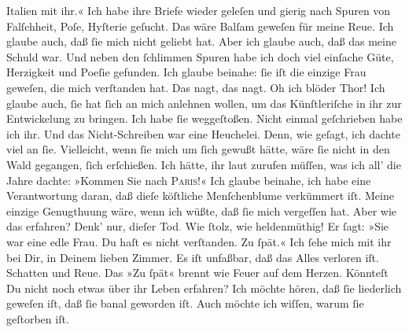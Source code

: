 \begin{ledgroupsized}[t]{13cm}
                  Italien mit ihr.«\pend
           \pstart
           Ich habe ihre Briefe wieder geleſen und gierig nach Spuren von Falſchheit, Poſe,
               Hyſterie geſucht. Das wäre Balſam geweſen für meine Reue. Ich glaube auch, daß ſie
               mich nicht geliebt hat. Aber ich glaube auch, daß das meine Schuld war. Und neben den
                  {\pb}ſchlimmen Spuren habe ich doch viel einſache
               Güte, Herzigkeit und Poeſie gefunden. Ich glaube beinahe: ſie iſt die einzige Frau
               geweſen, die mich \strikeout{\textcolor{gray}{ver}} verſtanden
               hat. Das nagt, das nagt. Oh ich blöder Thor!\pend
           \pstart
           Ich glaube auch, ſie hat ſich an mich anlehnen wollen, um das Künſtleriſche in ihr
               zur Entwickelung zu bringen. Ich habe ſie weggeſtoßen. Nicht einmal geſchrieben habe
               ich ihr. Und das Nicht-Schreiben war eine Heuchelei. Denn, wie geſagt, ich dachte
               viel an ſie. Vielleicht, wenn ſie mich um ſich gewußt hätte, wäre ſie nicht in den
               Wald {\pb}gegangen, ſich erſchießen. Ich hätte, ihr laut
               zurufen müſſen, was ich all’ die Jahre dachte: »Kommen Sie nach \textsc{Paris}!« Ich glaube beinahe, ich habe
               eine Verantwortung daran, daß dieſe köſtliche Menſchenblume verkümmert iſt. Meine einzige Genugthuung
               wäre, wenn ich wüßte, daß ſie mich vergeſſen hat. Aber wie das erfahren?\pend
           \pstart
           Denk’ nur, dieſer Tod\textcolor{gray}{.} Wie ſtolz, wie heldenmüthig! Er ſagt: »Sie
               war eine edle Frau. Du haſt es nicht verſtanden. Zu ſpät.«\pend
           \pstart
           Ich ſehe mich mit ihr bei Dir, in Deinem lieben {\pb}Zimmer. Es iſt unfaßbar, daß das Alles verloren iſt. Schatten und Reue. Das »Zu
               ſpät« brennt wie Feuer auf dem Herzen.\pend
           \pstart
           Könnteſt Du nicht noch etwas über ihr Leben erfahren? Ich möchte hören, daß ſie liederlich geweſen iſt, daß
               ſie banal geworden iſt. Auch möchte ich wiſſen, \strikeout{\textcolor{gray}{×}} warum ſie geſtorben iſt.

\end{ledgroupsized}
